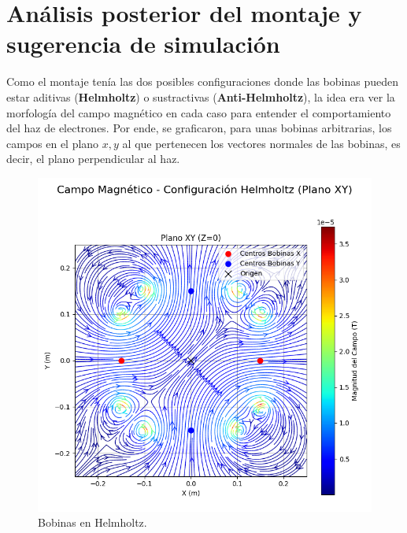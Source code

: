 \section{Análisis posterior del montaje y sugerencia de simulación}

Como el montaje tenía las dos posibles configuraciones donde las bobinas pueden estar aditivas (\textbf{Helmholtz}) o sustractivas (\textbf{Anti-Helmholtz}), la idea era ver la morfología del campo magnético en cada caso para entender el comportamiento del haz de electrones. Por ende, se graficaron, para unas bobinas arbitrarias, los campos en el plano $x,y$ al que pertenecen los vectores normales de las bobinas, es decir, el plano perpendicular al haz.

\begin{figure}[H]
    \centering
    \begin{minipage}[b]{0.48\textwidth}
        \includegraphics[width=\linewidth]{Sections/Figures/helmholtz_xy_field.png}
        \caption{Bobinas en  Helmholtz.}
        \label{fig:helmholtz_xy_field}
    \end{minipage}
    \hfill
    \begin{minipage}[b]{0.48\textwidth}

\end{minipage}
\end{figure}
